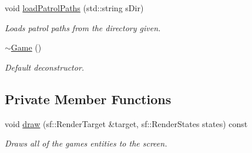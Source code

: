 \begin{DoxyCompactItemize}
void \hyperlink{class_game_a0caffc2dae20f8c6679f2753c99bcae7}{load\+Patrol\+Paths} (std\+::string s\+Dir)
\begin{DoxyCompactList}\small\item\em Loads patrol paths from the directory given. \end{DoxyCompactList}\item 
\hyperlink{class_game_ae3d112ca6e0e55150d2fdbc704474530}{$\sim$\+Game} ()
\begin{DoxyCompactList}\small\item\em Default deconstructor. \end{DoxyCompactList}\end{DoxyCompactItemize}
\subsection*{Private Member Functions}
\begin{DoxyCompactItemize}
\item 
void \hyperlink{class_game_a143d1a2f8a527db60f1fe47ab3d854a7}{draw} (sf\+::\+Render\+Target \&target, sf\+::\+Render\+States states) const
\begin{DoxyCompactList}\small\item\em Draws all of the game\textquotesingle{}s entities to the screen. \end{DoxyCompactList}\end{DoxyCompactItemize}
